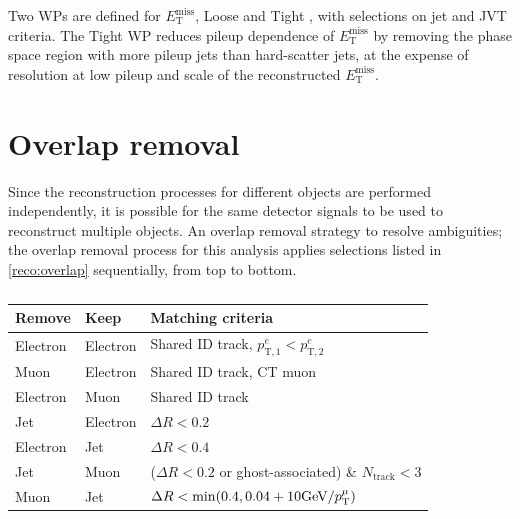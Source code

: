 \documentclass[../thesis.tex]{subfiles}
\begin{document}
Two WPs are defined for $E_\mathrm{T}^\mathrm{miss}$, Loose and Tight \citep{reco:met2}, with selections on jet \pT and JVT criteria. The Tight WP reduces pileup dependence of $E_\mathrm{T}^\mathrm{miss}$ by removing the phase space region with more pileup jets than hard-scatter jets, at the expense of resolution at low pileup and scale of the reconstructed $E_\mathrm{T}^\mathrm{miss}$.

\section{Overlap removal}
Since the reconstruction processes for different objects are performed independently, it is possible for the same detector signals to be used to reconstruct multiple objects. An overlap removal strategy to resolve ambiguities; the overlap removal process for this analysis applies selections listed in \autoref{reco:overlap} sequentially, from top to bottom.

\begin{table}[!ht]
\centering
\begin{tabular}{lll}
\toprule
Remove		& Keep		& Matching criteria \\
\midrule
Electron	& Electron 	& Shared ID track, $p^e_\mathrm{T,1}<p^e_\mathrm{T,2}$ \\
Muon		& Electron	& Shared ID track, CT muon \\
Electron	& Muon		& Shared ID track \\
Jet			& Electron	& $\Delta R <0.2$ \\
Electron	& Jet		& $\Delta R <0.4$ \\
Jet			& Muon		& ($\Delta R <0.2$ or ghost-associated) \& $N_\text{track}<3$ \\
Muon		& Jet		& $\Delta R < \min(0.4, 0.04+10 \text{GeV/\ensuremath{p_\mathrm{T}^\mu}})$ \\
\bottomrule
\end{tabular}
\caption{\label{reco:overlap}\citep{reco:overlap}}%
\end{table}
\end{document}
